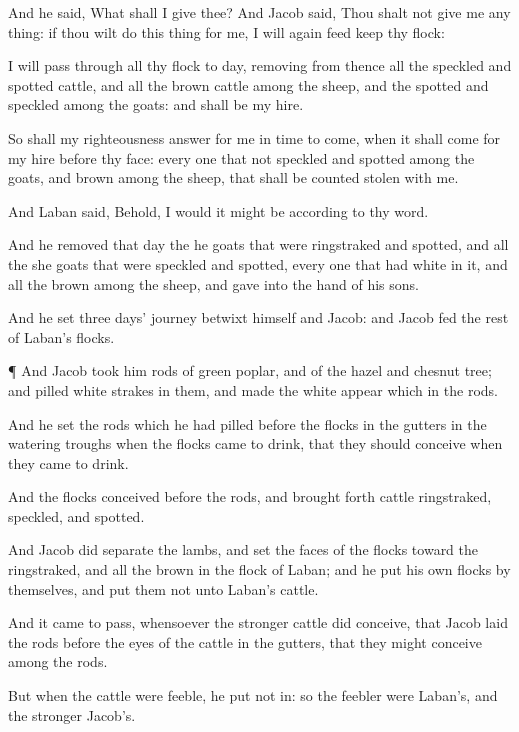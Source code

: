 {And he
said, What shall I give
thee? And
Jacob
said, Thou shalt not
give me any
thing: if thou wilt
do this
thing for me, I will
again
feed
{}
keep thy
flock:

I will
pass through all thy
flock to
day,
removing from thence all the
speckled and
spotted
cattle, and all the
brown
cattle among the
sheep, and the
spotted and
speckled among the
goats: and
{} shall be my
hire.

So shall my
righteousness
answer for me in
time to
come, when it shall
come for my
hire before thy
face: every
one that
{} not
speckled and
spotted among the
goats, and
brown among the
sheep, that shall be counted
stolen with me.

And
Laban
said, Behold, I would it might
be according to thy
word.

And he
removed that
day the he
goats that were
ringstraked and
spotted, and all the she
goats that were
speckled and
spotted,
{} every one that had
{}
white in it, and all the
brown among the
sheep, and
gave
{} into the
hand of his
sons.

And he
set
three
days’
journey betwixt himself and
Jacob: and
Jacob
fed the
rest of
Laban’s
flocks.


\par }{\PP {}¶ And
Jacob
took him
rods of
green
poplar, and of the
hazel and chesnut
tree; and
pilled
white
strakes in them, and made the
white
appear which
{} in the
rods.

And he
set the
rods which he had
pilled
before the
flocks in the
gutters in the
watering
troughs when the
flocks
came to
drink, that they should
conceive when they
came to
drink.

And the
flocks
conceived before the
rods, and brought
forth
cattle
ringstraked,
speckled, and
spotted.

And
Jacob did
separate the
lambs, and
set the
faces of the
flocks
toward the
ringstraked, and all the
brown in the
flock of
Laban; and he
put his own
flocks by themselves, and
put them not unto
Laban’s
cattle.

And it came to pass, whensoever the
stronger
cattle did
conceive, that
Jacob
laid the
rods before the
eyes of the
cattle in the
gutters, that they might
conceive among the
rods.

But when the
cattle were
feeble, he put
{} not
in: so the
feebler were
Laban’s, and the
stronger
Jacob’s.

}
